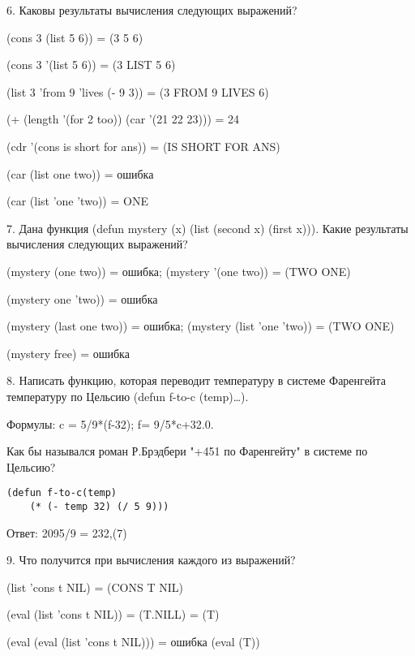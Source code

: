 6. Каковы результаты вычисления следующих выражений?

(cons 3 (list 5 6)) = (3 5 6)

(cons 3 '(list 5 6)) = (3 LIST 5 6)

(list 3 'from 9 'lives (- 9 3)) = (3 FROM 9 LIVES 6)

(+ (length '(for 2 too)) (car '(21 22 23))) = 24

(cdr '(cons is short for ans)) = (IS SHORT FOR ANS)

(car (list one two)) = ошибка

(car (list 'one 'two)) = ONE

7. Дана функция (defun mystery (x) (list (second x) (first x))).
Какие результаты вычисления следующих выражений?

(mystery (one two)) = ошибка; (mystery '(one two)) = (TWO ONE)

(mystery one 'two)) = ошибка

(mystery (last one two)) = ошибка; (mystery (list 'one 'two)) = (TWO ONE)

(mystery free) = ошибка

8. Написать функцию, которая переводит температуру в системе Фаренгейта температуру по Цельсию (defun f-to-c (temp)…).

Формулы: c = 5/9*(f-32); f= 9/5*c+32.0.

Как бы назывался роман Р.Брэдбери "+451 по Фаренгейту" в системе по Цельсию?

\begin{lstlisting}[language=LISP, caption=Задание 8]
(defun f-to-c(temp)
	(* (- temp 32) (/ 5 9)))
\end{lstlisting}

Ответ: 2095/9 = 232,(7)

9. Что получится при вычисления каждого из выражений?

(list 'cons t NIL) = (CONS T NIL)

(eval (list 'cons t NIL)) = (T.NILL) = (T)

(eval (eval (list 'cons t NIL))) = ошибка (eval (T))